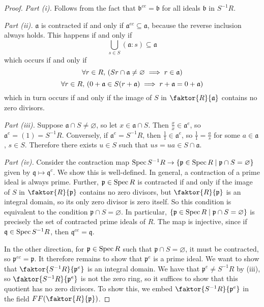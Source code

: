 \begin{proof}
    \emph{Part (i).}
    Follows from the fact that \( \mathfrak b^{ce} = \mathfrak b \) for all ideals \( \mathfrak b \) in \( S^{-1}R \).

    \emph{Part (ii).}
    \( \mathfrak a \) is contracted if and only if \( \mathfrak a^{ec} \subseteq \mathfrak a \), because the reverse inclusion always holds.
    This happens if and only if
    \[ \bigcup_{s \in S} (\mathfrak a : s) \subseteq \mathfrak a \]
    which occurs if and only if
    \[ \forall r \in R,\, \qty(Sr \cap \mathfrak a \neq \varnothing \implies r \in \mathfrak a) \]
    \[ \forall r \in R,\, \qty(0 + \mathfrak a \in S(r + \mathfrak a) \implies r + \mathfrak a = 0 + \mathfrak a) \]
    which in turn occurs if and only if the image of \( S \) in \( \faktor{R}{\mathfrak a} \) contains no zero divisors.

    \emph{Part (iii).}
    Suppose \( \mathfrak a \cap S \neq \varnothing \), so let \( x \in \mathfrak a \cap S \).
    Then \( \frac{x}{x} \in \mathfrak a^e \), so \( \mathfrak a^e = (1) = S^{-1}R \).
    Conversely, if \( \mathfrak a^e = S^{-1}R \), then \( \frac{1}{1} \in \mathfrak a^e \), so \( \frac{1}{1} = \frac{a}{s} \) for some \( a \in \mathfrak a \), \( s \in S \).
    Therefore there exists \( u \in S \) such that \( us = ua \in S \cap \mathfrak a \).

    \emph{Part (iv).}
    Consider the contraction map \( \operatorname{Spec} S^{-1}R \to \qty{\mathfrak p \in \operatorname{Spec}R \mid \mathfrak p \cap S = \varnothing} \) given by \( \mathfrak q \mapsto \mathfrak q^c \).
    We show this is well-defined.
    In general, a contraction of a prime ideal is always prime.
    Further, \( \mathfrak p \in \operatorname{Spec} R \) is contracted if and only if the image of \( S \) in \( \faktor{R}{\mathfrak p} \) contains no zero divisors, but \( \faktor{R}{\mathfrak p} \) is an integral domain, so its only zero divisor is zero itself.
    So this condition is equivalent to the condition \( \mathfrak p \cap S = \varnothing \).
    In particular, \( \qty{\mathfrak p \in \operatorname{Spec}R \mid \mathfrak p \cap S = \varnothing} \) is precisely the set of contracted prime ideals of \( R \).
    The map is injective, since if \( \mathfrak q \in \operatorname{Spec} S^{-1}R \), then \( \mathfrak q^{ce} = \mathfrak q \).

    In the other direction, for \( \mathfrak p \in \operatorname{Spec} R \) such that \( \mathfrak p \cap S = \varnothing \), it must be contracted, so \( \mathfrak p^{ec} = \mathfrak p \).
    It therefore remains to show that \( \mathfrak p^e \) is a prime ideal.
    We want to show that \( \faktor{S^{-1}R}{\mathfrak p^e} \) is an integral domain.
    We have that \( \mathfrak p^e \neq S^{-1}R \) by (iii), so \( \faktor{S^{-1}R}{\mathfrak p^e} \) is not the zero ring, so it suffices to show that this quotient has no zero divisors.
    To show this, we embed \( \faktor{S^{-1}R}{\mathfrak p^e} \) in the field \( FF\qty(\faktor{R}{\mathfrak p}) \).


\end{proof}
